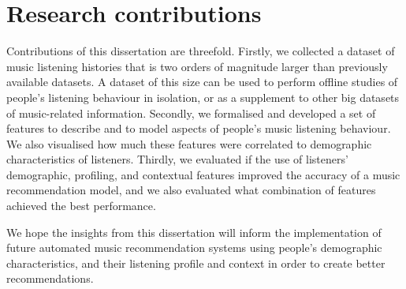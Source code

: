 \section{Research contributions}
Contributions of this dissertation are threefold. 
Firstly, we collected a dataset of music listening histories that is two orders of magnitude larger than previously available datasets. A dataset of this size can be used to perform offline studies of people's listening behaviour in isolation, or as a supplement to other big datasets of music-related information.
Secondly, we formalised and developed a set of features to describe and to model aspects of people's music listening behaviour. We also visualised how much these features were correlated to demographic characteristics of listeners.
Thirdly, we evaluated if the use of listeners' demographic, profiling, and contextual features improved the accuracy of a music recommendation model, and we also evaluated what combination of features achieved the best performance. 

We hope the insights from this dissertation will inform the implementation of future automated music recommendation systems using  people's demographic characteristics, and their listening profile and context in order to create better recommendations. 


